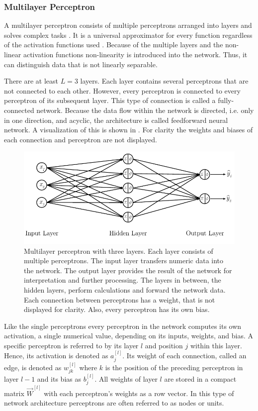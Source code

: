\subsubsection{Multilayer Perceptron}
\label{sec:mlp-multilayer-perceptron}
A multilayer perceptron consists of multiple perceptrons arranged into layers and solves complex tasks \cite{Bishop1995}.
It is a universal approximator for every function \cite{Cybenko1989} regardless of the activation functions used \cite{Hornik1991}.
Because of the multiple layers and the non-linear activation functions non-linearity is introduced into the network.
Thus, it can distinguish data that is not linearly separable.

There are at least $L=3$ layers.
Each layer contains several perceptrons that are not connected to each other.
However, every perceptron is connected to every perceptron of its subsequent layer.
This type of connection is called a fully-connected network.
Because the data flow within the network is directed, i.e. only in one direction, and acyclic, the architecture is called feedforward neural network.
A visualization of this is shown in .
For clarity the weights and biases of each connection and perceptron are not displayed.
\begin{figure}
	\centering
	\includegraphics{images/multilayer_perceptron}
	\caption[Multilayer perceptron]{Multilayer perceptron with three layers. Each layer consists of multiple perceptrons. The input layer transfers numeric data into the network. The output layer provides the result of the network for interpretation and further processing. The layers in between, the hidden layers, perform calculations and forward the network data. Each connection between perceptrons has a weight, that is not displayed for clarity. Also, every perceptron has its own bias.}
	\label{fig:multilayer-perceptron}
\end{figure}
Like the single perceptrons every perceptron in the network computes its own activation, a single numerical value, depending on its inputs, weights, and bias.
A specific perceptron is referred to by its layer $l$ and position $j$ within this layer.
Hence, its activation is denoted as $a^{[l]}_{j}$.
Its weight of each connection, called an edge, is denoted as $w^{[l]}_{jk}$ where $k$ is the position of the preceding perceptron in layer $l-1$ and its bias as $b^{[l]}_j$.
All weights of layer $l$ are stored in a compact matrix $\vec{W}^{[l]}$ with each perceptron's weights as a row vector.
In this type of network architecture perceptrons are often referred to as nodes or units.


